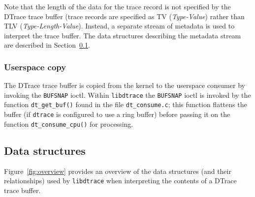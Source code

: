 Note that the length of the data for the trace record is not specified by the
DTrace trace buffer (trace records are specified as TV (\textit{Type-Value})
rather than TLV (\textit{Type-Length-Value}). Instead, a separate stream of
metadata is used to interpret the trace buffer. The data structures describing
the metadata stream are described in Section~\ref{subsec:probe_data_structures}.

\subsubsection{Userspace copy}
\label{subsubsec:bufsnap}

The DTrace trace buffer is copied from the kernel to the userspace consumer by
invoking the \texttt{BUFSNAP} ioctl. Within \texttt{libdtrace} the
\texttt{BUFSNAP} ioctl is invoked by the function \texttt{dt\_get\_buf()} found
in the file \texttt{dt\_consume.c}; this function flattens the buffer (if
\texttt{dtrace} is configured to use a ring buffer) before passing it on the
function \texttt{dt\_consume\_cpu()} for processing.

\subsection{Data structures}
\label{subsec:probe_data_structures}


Figure~\ref{fig:overview} provides an overview of the data structures (and
their relationships) used by \texttt{libdtrace} when interpreting the contents
of a DTrace trace buffer.

